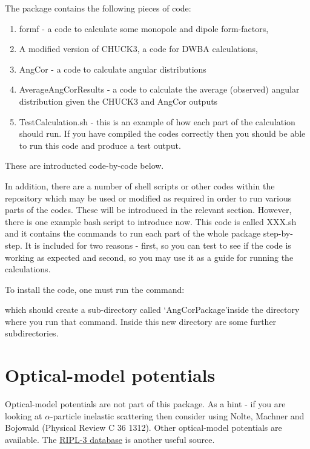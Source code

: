 \documentclass[a4paper,10pt]{article}
\begin{document}
The package contains the following pieces of code:

\begin{enumerate}
 \item formf - a code to calculate some monopole and dipole form-factors,
 \item A modified version of CHUCK3, a code for DWBA calculations,
 \item AngCor - a code to calculate angular distributions
 \item AverageAngCorResults - a code to calculate the average (observed) angular distribution given the CHUCK3 and AngCor outputs
 \item TestCalculation.sh - this is an example of how each part of the calculation should run. If you have compiled the codes correctly then you should be able to run this code and produce a test output.
\end{enumerate}

These are introducted code-by-code below.

In addition, there are a number of shell scripts or other codes within the repository which may be used or modified as required in order to run various parts of the codes. These will be introduced in the relevant section. However, there is one example bash script to introduce now. This code is called XXX.sh and it contains the commands to run each part of the whole package step-by-step. It is included for two reasons - first, so you can test to see if the code is working as expected and second, so you may use it as a guide for running the calculations.

To install the code, one must run the command:\\

which should create a sub-directory called \textquoteleft AngCorPackage\textquoteright inside the directory where you run that command. Inside this new directory are some further subdirectories.

\section{Optical-model potentials}

Optical-model potentials are not part of this package. As a hint - if you are looking at $\alpha$-particle inelastic scattering then consider using Nolte, Machner and Bojowald (Physical Review C 36 1312). Other optical-model potentials are available. The \href{https://www-nds.iaea.org/RIPL-3/}{RIPL-3 database} is another useful source.
\end{document}
